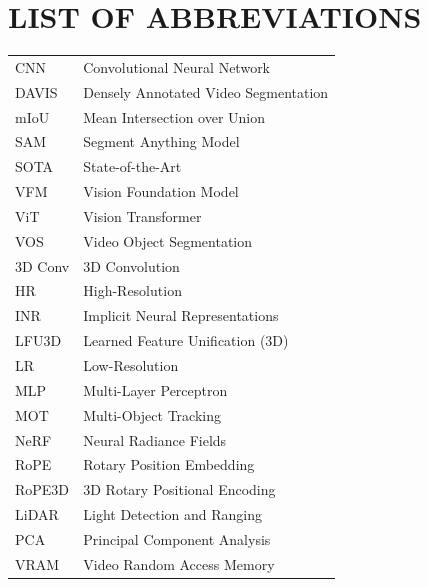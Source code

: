 \documentclass[12pt, a4paper]{report}
\begin{document}
\listoftables
{}

\listoffigures
{}

\chapter*{LIST OF ABBREVIATIONS}
\begin{tabular}{ll}
    CNN & Convolutional Neural Network \\
    DAVIS & Densely Annotated Video Segmentation \\
    mIoU & Mean Intersection over Union \\
    SAM & Segment Anything Model \\
    SOTA & State-of-the-Art \\
    VFM & Vision Foundation Model \\
    ViT & Vision Transformer \\
    VOS & Video Object Segmentation \\
    3D Conv & 3D Convolution \\
    HR & High-Resolution \\
    INR & Implicit Neural Representations \\
    LFU3D & Learned Feature Unification (3D) \\
    LR & Low-Resolution \\
    MLP & Multi-Layer Perceptron \\
    MOT & Multi-Object Tracking \\
    NeRF & Neural Radiance Fields \\
    RoPE & Rotary Position Embedding \\
    RoPE3D & 3D Rotary Positional Encoding \\
    LiDAR & Light Detection and Ranging \\
    PCA & Principal Component Analysis \\
    VRAM & Video Random Access Memory \\
    
\end{tabular}

\newpage
{}


\renewcommand{\bibname}{REFERENCES}


\end{document}
